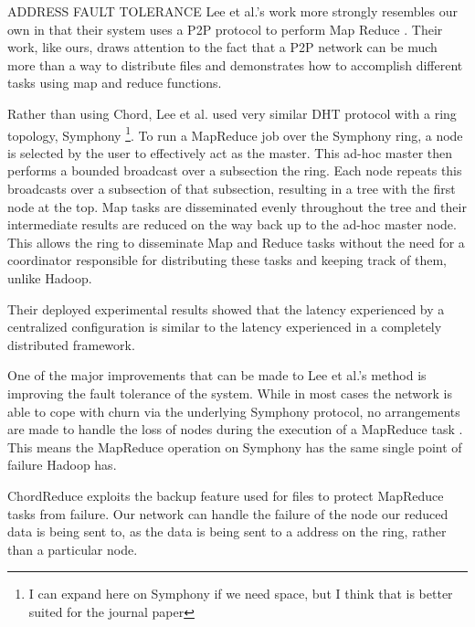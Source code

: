 \documentclass[conference, compsocconf, letterpaper]{IEEEtran}
\begin{document}
ADDRESS FAULT TOLERANCE
Lee et al.'s work more strongly resembles our own in that their system uses a P2P protocol to perform Map Reduce \cite{leemap}.  Their work, like ours, draws attention to the fact that a P2P network can be much more than a way to distribute files and demonstrates how to accomplish different tasks using map and reduce functions.

Rather than using Chord, Lee et al. used very similar DHT protocol with a ring topology, Symphony \cite{symphony}\footnote{I can expand here on Symphony if we need space, but I think that is better suited for the journal paper}.  To run a MapReduce job over the Symphony ring, a node is selected by the user to effectively act as the master.  This ad-hoc master then performs a bounded broadcast over a subsection the ring.  Each node repeats this broadcasts over a subsection of that subsection, resulting in a tree with the first node at the top.  Map tasks are disseminated evenly throughout the tree and their intermediate results are reduced on the way back up to the ad-hoc master node.  This allows the ring to disseminate Map and Reduce tasks without the need for a coordinator responsible for distributing these tasks and keeping track of them, unlike Hadoop.
 

Their deployed experimental results showed that the latency experienced by a centralized configuration is similar to the latency experienced in a completely distributed framework.

One of the major improvements that can be made to Lee et al.'s method is improving the fault tolerance of the system.  While in most cases the network is able to cope with churn via the underlying Symphony protocol, no arrangements are made to handle the loss of nodes during the execution of a MapReduce task \cite{leemap}.  This means the MapReduce operation on Symphony has the same single point of failure Hadoop has. 

ChordReduce exploits the backup feature used for files to protect MapReduce tasks from failure.  Our network can handle the failure of the node our reduced data is being sent to, as the data is being sent to a address on the ring, rather than a particular node.



\end{document}
